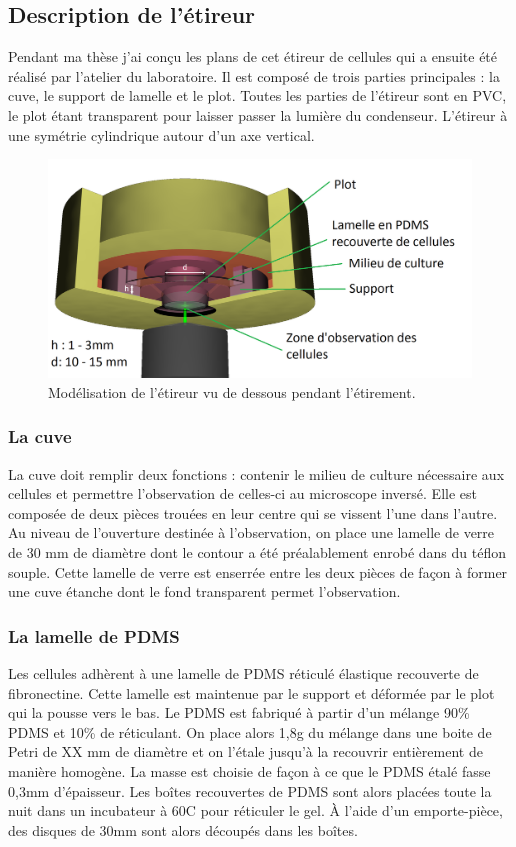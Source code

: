 \documentclass{report}
\begin{document}
	\subsection{Description de l'étireur}
	Pendant ma thèse j'ai conçu les plans de cet étireur de cellules qui a ensuite été réalisé par l'atelier du laboratoire. Il est composé de trois parties principales : la cuve, le support de lamelle et le plot. Toutes les parties de l'étireur sont en PVC, le plot étant transparent pour laisser passer la lumière du condenseur. L'étireur à une symétrie cylindrique autour d'un axe vertical. 
	\begin{figure}
	\includegraphics[scale=0.2]{Etireur_3D_vue_dessous_rayon_blanc.png}
	\caption{Modélisation de l'étireur vu de dessous pendant l'étirement.}
	\end{figure}
	\subsubsection{La cuve}
	La cuve doit remplir deux fonctions : contenir le milieu de culture nécessaire aux cellules et permettre l'observation de celles-ci au microscope inversé. Elle est composée de deux pièces trouées en leur centre qui se vissent l'une dans l'autre. Au niveau de l'ouverture destinée à l'observation, on place une lamelle de verre de 30 mm de diamètre dont le contour a été préalablement enrobé dans du téflon souple. Cette lamelle de verre est enserrée entre les deux pièces de façon à former une cuve étanche dont le fond transparent permet l'observation.
	\subsubsection{La lamelle de PDMS} 
	Les cellules adhèrent à une lamelle de PDMS réticulé élastique recouverte de fibronectine. Cette lamelle est maintenue par le support et déformée par le plot qui la pousse vers le bas. 
	Le PDMS est fabriqué à partir d'un mélange 90\% PDMS et 10\% de réticulant. On place alors 1,8g du mélange dans une boite de Petri de XX mm de diamètre et on l'étale jusqu'à la recouvrir entièrement de manière homogène. La masse est choisie de façon à ce que le PDMS étalé fasse 0,3mm d'épaisseur. Les boîtes recouvertes de PDMS sont alors placées toute la nuit dans un incubateur à 60\degres  C pour réticuler le gel. À l'aide d'un emporte-pièce, des disques de 30mm sont alors découpés dans les boîtes.
\end{document}
